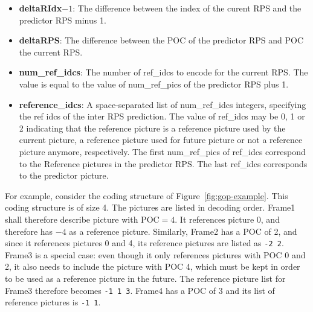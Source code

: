 \documentclass[a4paper,11pt]{jctvcdoc}
\begin{document}
\begin{itemize}
\item[]\textbf{deltaRIdx$-1$}: The difference between the index of the
curent RPS and the predictor RPS minus 1.

\item[]\textbf{deltaRPS}: The difference between the POC of the
predictor RPS and POC the current RPS.

\item[]\textbf{num_ref_idcs}: The number of ref_idcs to encode for the
current RPS.  The value is equal to the value of  num_ref_pics of the
predictor RPS plus 1.

\item[]\textbf{reference_idcs}: A space-separated list of num_ref_idcs
integers, specifying the ref idcs of the inter RPS prediction. The value
of ref_idcs may be 0, 1 or 2 indicating that the reference picture is a
reference picture used by the current picture, a reference picture used
for future picture or not a reference picture anymore, respectively. The
first num_ref_pics of ref_idcs correspond to the Reference pictures in
the predictor RPS. The last ref_idcs corresponds to the predictor
picture.
\end{itemize}

For example, consider the coding structure of Figure~\ref{fig:gop-example}.
This coding structure is of size 4. The pictures are listed in decoding
order. Frame1 shall therefore describe picture with $\textrm{POC}=4$. It
references picture 0, and therefore has $-4$ as a reference picture.
Similarly, Frame2 has a POC of 2, and since it references pictures 0 and
4, its reference pictures are listed as \verb|-2 2|. Frame3 is a special
case: even though it only references pictures with POC 0 and 2, it also
needs to include the picture with POC 4, which must be kept in order to
be used as a reference picture in the future. The reference picture list
for Frame3 therefore becomes \verb|-1 1 3|. Frame4 has a POC of 3 and
its list of reference pictures is \verb|-1 1|.
\end{document}
